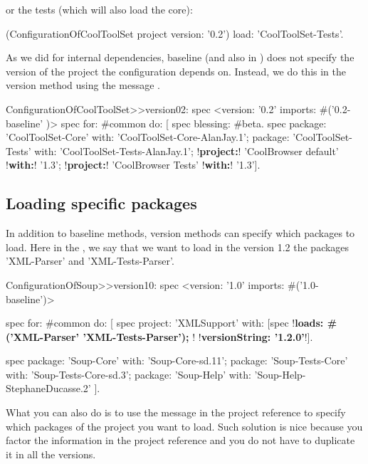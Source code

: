 \documentclass[a4paper,10pt,twoside]{book}
\begin{document}
\noindent
or the tests (which will also load the core):
\begin{code}{}
  (ConfigurationOfCoolToolSet project version: '0.2') load: 'CoolToolSet-Tests'.
\end{code}

As we did for internal dependencies, baseline  (and also in ) does not specify the version of the project the configuration depends on. Instead, we do this in the version method using the message .

\begin{code}{}
ConfigurationOfCoolToolSet>>version02: spec
       <version: '0.2' imports: #('0.2-baseline' )>
       spec for: #common do: [
              spec blessing: #beta.
              spec
                     package: 'CoolToolSet-Core' with: 'CoolToolSet-Core-AlanJay.1';
                     package: 'CoolToolSet-Tests' with: 'CoolToolSet-Tests-AlanJay.1';
                     !\textbf{project:}! 'CoolBrowser default' !\textbf{with:}! '1.3';
                     !\textbf{project:}! 'CoolBrowser Tests' !\textbf{with:}! '1.3'].
\end{code}

\subsection{Loading specific packages}

In addition to baseline methods, version methods can specify
which packages to load. Here in the , we say
that we want to load in the version 1.2 the packages 'XML-Parser' and
'XML-Tests-Parser'.

\begin{code}{}
ConfigurationOfSoup>>version10: spec
	<version: '1.0' imports:  #('1.0-baseline')>

	spec for: #common do: [
		spec
			project: 'XMLSupport'
			with: [spec
						!\textbf{loads: \#('XML-Parser' 'XML-Tests-Parser'); }!
						!\textbf{versionString: '1.2.0'}!].

		spec
			package: 'Soup-Core' with: 'Soup-Core-sd.11';
			package: 'Soup-Tests-Core' with: 'Soup-Tests-Core-sd.3';
			package: 'Soup-Help' with: 'Soup-Help-StephaneDucasse.2' ].
\end{code}


What you can also do is to use the  message in the project reference to specify which packages of the project you want to load. Such solution is nice because you factor the information in the project reference and you do not have to duplicate it in all the versions.
\end{document}
